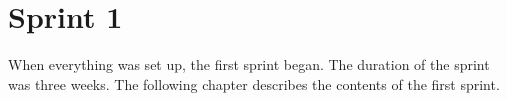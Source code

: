 \chapter{Sprint 1}
When everything was set up, the first sprint began. The duration of the sprint was three weeks. The following chapter describes the contents of the first sprint.